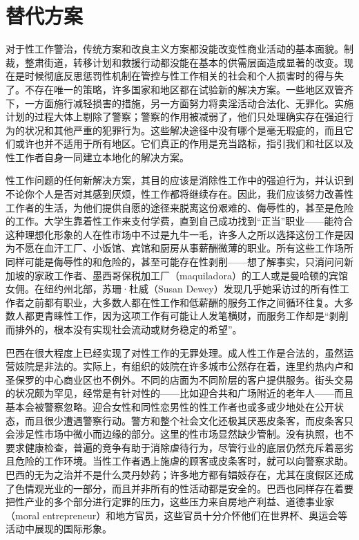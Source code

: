 \documentclass[fontset=fandol, a4paper, 12pt, openright]{ctexbook}
\begin{document}
\section{替代方案}

对于性工作警治，传统方案和改良主义方案都没能改变性商业活动的基本面貌。制裁，整肃街道，转移计划和救援行动都没能在基本的供需层面造成显著的改变。现在是时候彻底反思惩罚性机制在管控与性工作相关的社会和个人损害时的得与失了。不存在唯一的策略，许多国家和地区都在试验新的解决方案。一些地区双管齐下，一方面施行减轻损害的措施，另一方面努力将卖淫活动合法化、无罪化。实施计划的过程大体上剔除了警察；警察的作用被减弱了，他们只处理确实存在强迫行为的状况和其他严重的犯罪行为。这些解决途径中没有哪个是毫无瑕疵的，而且它们或许也并不适用于所有地区。它们真正的作用是充当路标，指引我们和社区以及性工作者自身一同建立本地化的解决方案。

性工作问题的任何新解决方案，其目的应该是消除性工作中的强迫行为，并认识到不论你个人是否对其感到厌烦，性工作都将继续存在。因此，我们应该努力改善性工作者的生活，为他们提供自愿的途径来脱离这份艰难的、侮辱性的，甚至是危险的工作。大学生靠着性工作来支付学费，直到自己成功找到“正当”职业——能符合这种理想化形象的人在性市场中不过是九牛一毛，许多人之所以选择这份工作是因为不愿在血汗工厂、小饭馆、宾馆和厨房从事薪酬微薄的职业。所有这些工作场所同样可能是侮辱性的和危险的，甚至可能存在性剥削——想了解事实，只消问问新加坡的家政工作者、墨西哥保税加工厂（maquiladora）的工人或是曼哈顿的宾馆女佣。在纽约州北部，苏珊·杜威（Susan Dewey）发现几乎她采访过的所有性工作者之前都有职业，大多数人都在性工作和低薪酬的服务工作之间循环往复。大多数人都更青睐性工作，因为这项工作有可能让人发笔横财，而服务工作却是“剥削而排外的，根本没有实现社会流动或财务稳定的希望”。

巴西在很大程度上已经实现了对性工作的无罪处理。成人性工作是合法的，虽然运营妓院是非法的。实际上，有组织的妓院在许多城市公然存在着，连里约热内卢和圣保罗的中心商业区也不例外。不同的店面为不同阶层的客户提供服务。街头交易的状况颇为罕见，经常是有针对性的——比如迎合共和广场附近的老年人——而且基本会被警察忽略。迎合女性和同性恋男性的性工作者也或多或少地处在公开状态，而且很少遭遇警察行动。警方和整个社会文化还极其厌恶皮条客，而皮条客只会涉足性市场中微小而边缘的部分。这里的性市场显然缺少管制。没有执照，也不要求健康检查，普遍的竞争有助于消除虐待行为，尽管行业的底层仍然充斥着恶劣且危险的工作环境。当性工作者遇上施虐的顾客或皮条客时，就可以向警察求助。巴西的无为之治并不是什么灵丹妙药；许多地方都有娼妓存在，尤其在度假区还成了色情观光业的一部分，而且并非所有的性活动都是安全的。巴西也同样存在着要把性产业的多个部分进行定罪的压力，这些压力来自房地产利益、道德事业家（moral entrepreneur）和地方官员，这些官员十分介怀他们在世界杯、奥运会等活动中展现的国际形象。
\end{document}
